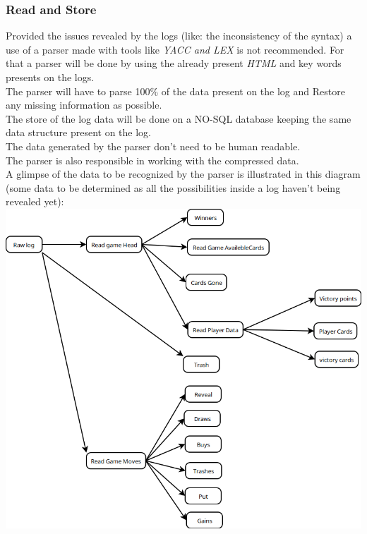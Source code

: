 \documentclass{scrreprt}
\begin{document}
\subsubsection{Read and Store}
Provided the issues revealed by the logs (like: the inconsistency of the syntax)
a use of a parser made with tools like \textit{YACC and LEX} is not recommended.
For that a parser will be done by using the already present \textit{HTML} and
key words presents on the logs.\\

The parser will have to parse 100\% of the data present on the log and Restore
any missing information as possible.\\

The store of the log data will be done on a NO-SQL database keeping the same
data structure present on the log.\\

The data generated by the parser don't need to be human readable.\\

The parser is also responsible in working with the compressed data.\\
\newpage
A glimpse of the data to be recognized by the parser is illustrated in this
diagram (some data to be determined as all the possibilities inside a log
haven't being revealed yet):\\
\includegraphics[width=\textwidth,height=\textheight,keepaspectratio]{UseCaseParser}
\end{document}
